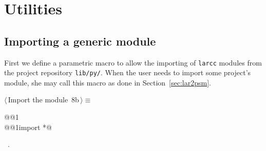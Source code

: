 \documentclass[11pt,oneside]{article}	%
\begin{document}
\appendix
\section{Utilities}

\subsection{Importing a generic module}
First we define a parametric macro to allow the importing of \texttt{larcc} modules from the project repository \texttt{lib/py/}. When the user needs to import some project's module, she may call this macro as done in Section~\ref{sec:lar2psm}.
\begin{flushleft} \small
\begin{minipage}{\linewidth} \label{scrap15}
\protect{}$\langle\,$Import the module\nobreak\ {\footnotesize 8b}$\,\rangle\equiv$
\vspace{-1ex}
\begin{list}{}{} \item
\mbox{}\verb@import @@1\verb@@\\
\mbox{}\verb@from @@1\verb@ import *@\\
\mbox{}\verb@@{\NWsep}
\end{list}
\vspace{-1ex}
\footnotesize\addtolength{\baselineskip}{-1ex}
\begin{list}{}{\setlength{\itemsep}{-\parsep}\setlength{\itemindent}{-\leftmargin}}
\item \NWtxtMacroRefIn\ .
\end{list}
\end{minipage}\\[4ex]
\end{flushleft}
\end{document}
